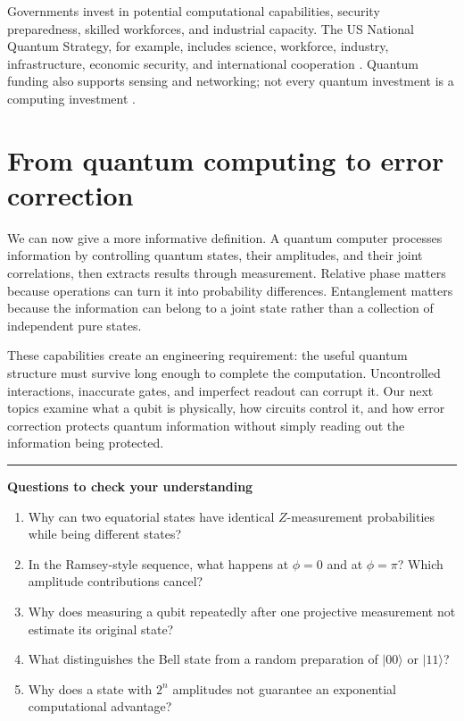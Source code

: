 \documentclass[11pt,a4paper]{article}
\newcommand{\ket}[1]{\lvert #1\rangle}
\begin{document}
Governments invest in potential computational capabilities, security preparedness, skilled workforces, and industrial capacity. The US National Quantum Strategy, for example, includes science, workforce, industry, infrastructure, economic security, and international cooperation \cite{strategy}. Quantum funding also supports sensing and networking; not every quantum investment is a computing investment \cite{nqi}.

\section{From quantum computing to error correction}
We can now give a more informative definition. A quantum computer processes information by controlling quantum states, their amplitudes, and their joint correlations, then extracts results through measurement. Relative phase matters because operations can turn it into probability differences. Entanglement matters because the information can belong to a joint state rather than a collection of independent pure states.

These capabilities create an engineering requirement: the useful quantum structure must survive long enough to complete the computation. Uncontrolled interactions, inaccurate gates, and imperfect readout can corrupt it. Our next topics examine what a qubit is physically, how circuits control it, and how error correction protects quantum information without simply reading out the information being protected.

\bigskip
\hrule
\medskip
\textbf{Questions to check your understanding}
\begin{enumerate}[leftmargin=1.5em]
\item Why can two equatorial states have identical $Z$-measurement probabilities while being different states?
\item In the Ramsey-style sequence, what happens at $\phi=0$ and at $\phi=\pi$? Which amplitude contributions cancel?
\item Why does measuring a qubit repeatedly after one projective measurement not estimate its original state?
\item What distinguishes the Bell state from a random preparation of $\ket{00}$ or $\ket{11}$?
\item Why does a state with $2^n$ amplitudes not guarantee an exponential computational advantage?
\end{enumerate}

\end{document}
